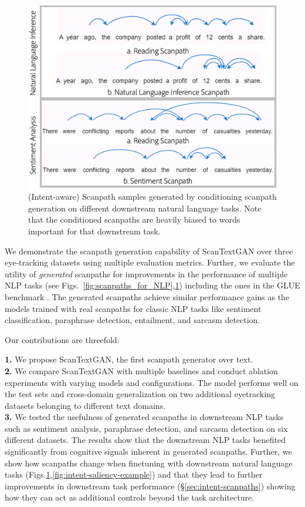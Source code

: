 \begin{figure}[!t]
    \centering
    \includegraphics[width=0.7\columnwidth]{images/intent-scantextgan-scanpaths-3.pdf}
    \caption{\small (Intent-aware) Scanpath samples generated by conditioning scanpath generation on different downstream natural language tasks. Note that the conditioned scanpaths are heavily biased to words important for that downstream task.}
    \label{fig:intent-scanpaths-example} 
\end{figure}


We demonstrate the scanpath generation capability of ScanTextGAN over three eye-tracking datasets using multiple evaluation metrics. Further, we evaluate the utility of \textit{generated} scanpaths for improvements in the performance of multiple NLP tasks (see Figs.~\ref{fig:scanpaths_for_NLP},\ref{fig:intent-scanpaths-example}) including the ones in the GLUE benchmark \cite{wang-etal-2018-glue}. The generated scanpaths achieve similar performance gains as the models trained with real scanpaths for classic NLP tasks like sentiment classification, paraphrase detection, entailment, and sarcasm detection. 

Our contributions are threefold:

\noindent \textbf{1.} We propose ScanTextGAN, the first scanpath generator over text. \\
\textbf{2.} We compare ScanTextGAN with multiple baselines and conduct ablation experiments with varying models and configurations. The model performs well on the test sets and cross-domain generalization on two additional eyetracking datasets belonging to different text domains.\\
\textbf{3.} We tested the usefulness of generated scanpaths in downstream NLP tasks such as sentiment analysis, paraphrase detection, and sarcasm detection on six different datasets. The results show that the downstream NLP tasks benefited significantly from cognitive signals inherent in generated scanpaths. Further, we show how scanpaths change when finetuning with downstream natural language tasks (Figs.\ref{fig:intent-scanpaths-example},\ref{fig:intent-saliency-example}) and that they lead to further improvements in downstream task performance (\S\ref{sec:intent-scanpaths}) showing how they can act as additional controls beyond the task architecture.


